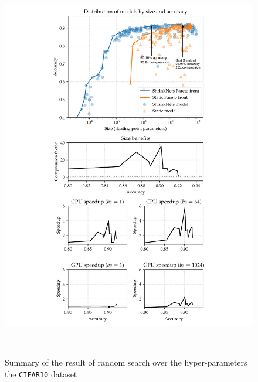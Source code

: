 \begin{figure}[t]\centering
\begin{minipage}{2.7in}
\centering
\includegraphics[width=\columnwidth]{CIFAR10_VGG_summary-arrows}
\vspace*{-10mm}
\caption{\label{figure_CIFAR10} Summary of the result of random
search over the hyper-parameters the \texttt{CIFAR10} dataset}
\vspace*{-5mm}
\end{minipage}
\begin{minipage}{.3in}
~~
\end{minipage}
\begin{minipage}{2.7in}

\end{minipage}
\end{figure}
